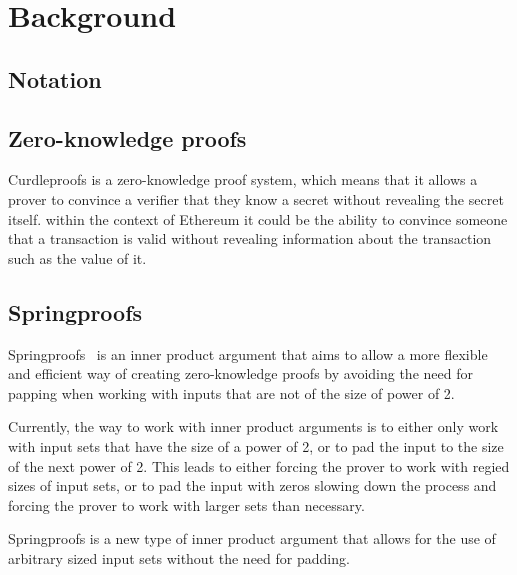 
\section{Background}\label{sec:background}


\subsection{Notation}\label{sec:background-notation}




\subsection{Zero-knowledge proofs}\label{sec:background-zkps}
Curdleproofs is a zero-knowledge proof system, which means that it allows a prover to convince a verifier that they know a secret without revealing the secret itself.
within the context of Ethereum it could be the ability to convince someone that a transaction is valid without revealing information about the transaction such as the value of it.




\subsection{Springproofs}\label{sec:background-springproofs}
Springproofs~\cite{zhang2024springproofs} is an inner product argument that aims to allow a more flexible and efficient way of creating zero-knowledge proofs by avoiding the need for papping when working with inputs that are not of the size of power of 2.

Currently, the way to work with inner product arguments is to either only work with input sets that have the size of a power of 2, or to pad the input to the size of the next power of 2.
This leads to either forcing the prover to work with regied sizes of input sets, or to pad the input with zeros slowing down the process and forcing the prover to work with larger sets than necessary.

Springproofs is a new type of inner product argument that allows for the use of arbitrary sized input sets without the need for padding.


